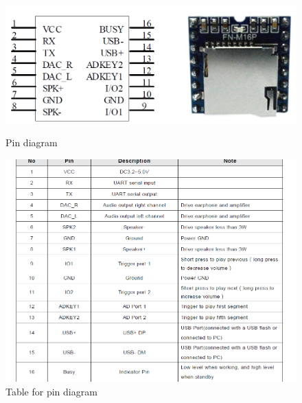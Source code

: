 \documentclass[11pt,a4paper]{article}
\begin{document}
   \begin{figure}
  \includegraphics[width=\linewidth]{10.png}
  \caption{Pin diagram}
    \includegraphics[width=\linewidth]{11.png}
  \caption{Table for pin diagram}
\end{figure}

\newpage
\end{document}

